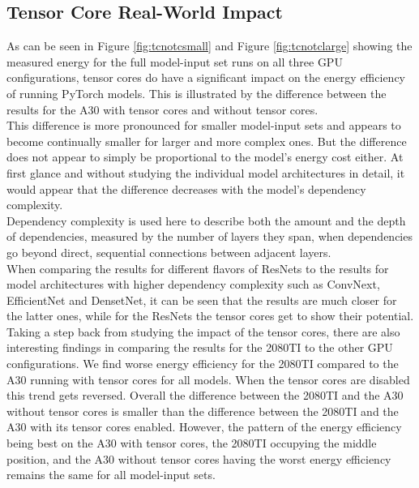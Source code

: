 \subsection{Tensor Core Real-World Impact}
As can be seen in Figure \ref{fig:tcnotcsmall} and Figure \ref{fig:tcnotclarge} showing the measured energy for the full model-input set runs on all three GPU configurations, tensor cores do have a significant impact on the energy efficiency of running PyTorch models. This is illustrated by the difference between the results for the A30 with tensor cores and without tensor cores. \\
This difference is more pronounced for smaller model-input sets and appears to become continually smaller for larger and more complex ones. But the difference does not appear to simply be proportional to the model's energy cost either. At first glance and without studying the individual model architectures in detail, it would appear that the difference decreases with the model's dependency complexity. \\
Dependency complexity is used here to describe both the amount and the depth of dependencies, measured by the number of layers they span, when dependencies go beyond direct, sequential connections between adjacent layers.\\
When comparing the results for different flavors of ResNets to the results for model architectures with higher dependency complexity such as ConvNext, EfficientNet and DensetNet, it can be seen that the results are much closer for the latter ones, while for the ResNets the tensor cores get to show their potential. \\
Taking a step back from studying the impact of the tensor cores, there are also interesting findings in comparing the results for the 2080TI to the other GPU configurations. We find worse energy efficiency for the 2080TI compared to the A30 running with tensor cores for all models. When the tensor cores are disabled this trend gets reversed. Overall the difference between the 2080TI and the A30 without tensor cores is smaller than the difference between the 2080TI and the A30 with its tensor cores enabled. However, the pattern of the energy efficiency being best on the A30 with tensor cores, the 2080TI occupying the middle position, and the A30 without tensor cores having the worst energy efficiency remains the same for all model-input sets.


